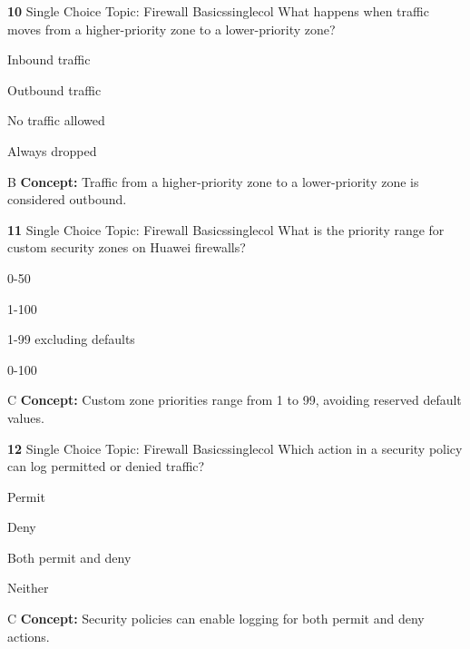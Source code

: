 \documentclass[10pt,a4paper]{article}
\begin{document}
\begin{qcard}{\color{white}\textbf{10} \hfill \small Single Choice \textbar{} Topic: Firewall Basics}{singlecol}
What happens when traffic moves from a higher-priority zone to a lower-priority zone?

\begin{qoptions}
\item Inbound traffic
\item Outbound traffic
\item No traffic allowed
\item Always dropped
\end{qoptions}
\begin{explainbox}{B}
\textbf{Concept:} Traffic from a higher-priority zone to a lower-priority zone is considered outbound.
\end{explainbox}
\end{qcard}

\begin{qcard}{\color{white}\textbf{11} \hfill \small Single Choice \textbar{} Topic: Firewall Basics}{singlecol}
What is the priority range for custom security zones on Huawei firewalls?

\begin{qoptions}
\item 0-50
\item 1-100
\item 1-99 excluding defaults
\item 0-100
\end{qoptions}
\begin{explainbox}{C}
\textbf{Concept:} Custom zone priorities range from 1 to 99, avoiding reserved default values.
\end{explainbox}
\end{qcard}

\begin{qcard}{\color{white}\textbf{12} \hfill \small Single Choice \textbar{} Topic: Firewall Basics}{singlecol}
Which action in a security policy can log permitted or denied traffic?

\begin{qoptions}
\item Permit
\item Deny
\item Both permit and deny
\item Neither
\end{qoptions}
\begin{explainbox}{C}
\textbf{Concept:} Security policies can enable logging for both permit and deny actions.
\end{explainbox}
\end{qcard}
\end{document}

